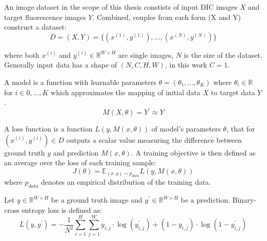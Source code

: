 \begin{definition}
	An image dataset in the scope of this thesis constists of input DIC images $X$ and target fluorescence images $Y$. Combined, couples from each form (X and Y) construct a dataset:
	\begin{equation}
		D = (X, Y) = \{(x^{(1)}, y^{(1)}), \dots, (x^{(N)}, y^{(N)})\}
	\end{equation}

	where both $x^{(i)}$ and $y^{(i)} \in \mathbb{R}^{W \times H}$ are single images, $N$ is the size of the dataset. Generally input data has a shape of $(N, C, H, W)$, in this work $C = 1$.
\end{definition}

\begin{definition}[Model]
	A model is a function with learnable parameters $\theta = (\theta_1, ..., \theta_K)$ where $\theta_i \in \mathbb{R}$ for $i \in {0, ..., K}$ which approximates the mapping of initial data $X$ to target data $Y$.
	\begin{equation}
		M(X,\theta) = Y^\prime \approx Y 
	\end{equation}
\end{definition}

\begin{definition}
	A loss function is a function $L(y, M(x, \theta))$ of model's parameters $\theta$, that for $(x^{(i)}, y^{(i)}) \in D$ outputs a scalar value measuring the difference between ground truth $y$ and prediction $M(x, \theta)$. A training objective is then defined as an average over the loss of each training sample:
	\begin{equation}
		J(\theta) = \mathbb{E}_{(x, y)\sim p_{data}} L(y, M(x, \theta))
	\end{equation}
	where $p_{data}$ denotes an empirical distribution of the training data.
\end{definition}

\begin{definition}
	Let $y \in \mathbb{R}^{W \times H}$ be a ground truth image and $y^\prime \in \mathbb{R}^{W \times H}$ be a prediction. Binary-cross entropy loss is defined as:
	\begin{equation}
		L(y, y^\prime) = - \frac{1}{N^2}\sum_{i=1}^{H} \sum_{j=1}^{W} y_{i,j} \cdot \log(y_{i, j}^\prime) +  (1 - y_{i, j}) \cdot \log(1 - y_{i, j}^\prime) 
	\end{equation}
\end{definition}

